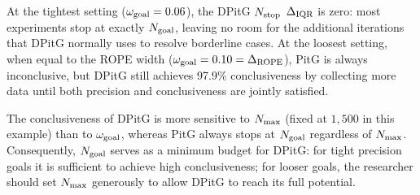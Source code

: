 At the tightest setting ($\omega_{\rm goal}=0.06$), the DPitG $N_{\rm stop}$ $\Delta_{\rm IQR}$ is zero:
most experiments stop at exactly $N_{\rm goal}$, leaving no room for the additional
iterations that DPitG normally uses to resolve borderline cases.
At the loosest setting, when equal to the ROPE width ($\omega_{\rm goal}=0.10=\Delta_{\rm ROPE}$), PitG is always
inconclusive, but DPitG still achieves 97.9\% conclusiveness by collecting more data until
both precision and conclusiveness are jointly satisfied.

The conclusiveness of DPitG is more sensitive to $N_{\rm max}$ (fixed at $1{,}500$ in this
example) than to $\omega_{\rm goal}$, whereas PitG always stops at $N_{\rm goal}$ regardless of $N_{\rm max}$.
Consequently, $N_{\rm goal}$ serves as a minimum budget for DPitG: for tight precision goals
it is sufficient to achieve high conclusiveness; for looser goals, the researcher should
set $N_{\rm max}$ generously to allow DPitG to reach its full potential.


